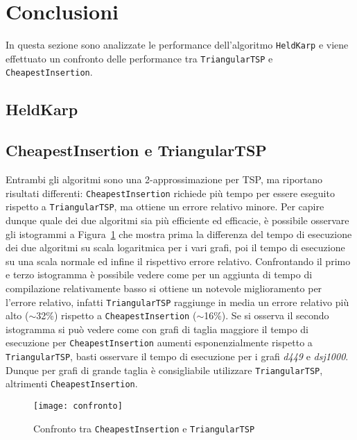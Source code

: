 \section{Conclusioni}
In questa sezione sono analizzate le performance dell'algoritmo \texttt{HeldKarp} e viene effettuato un confronto delle performance tra \texttt{TriangularTSP} e \texttt{CheapestInsertion}.

\subsection{HeldKarp}

\subsection{CheapestInsertion e TriangularTSP}
Entrambi gli algoritmi sono una 2-approssimazione per TSP, ma riportano risultati differenti: \texttt{CheapestInsertion} richiede più tempo per essere eseguito rispetto a \texttt{TriangularTSP}, ma ottiene un errore relativo minore. Per capire dunque quale dei due algoritmi sia più efficiente ed efficacie, è possibile osservare gli istogrammi a Figura~\ref{confronto} che mostra prima la differenza del tempo di esecuzione dei due algoritmi su scala logaritmica per i vari grafi, poi il tempo di esecuzione su una scala normale ed infine il rispettivo errore relativo. Confrontando il primo e terzo istogramma è possibile vedere come per un aggiunta di tempo di compilazione relativamente basso si ottiene un notevole miglioramento per l'errore relativo, infatti \texttt{TriangularTSP} raggiunge in media un errore relativo più alto ($\sim$32\%) rispetto a \texttt{CheapestInsertion} ($\sim$16\%). Se si osserva il secondo istogramma si può vedere come con grafi di taglia maggiore il tempo di esecuzione per \texttt{CheapestInsertion} aumenti esponenzialmente rispetto a \texttt{TriangularTSP}, basti osservare il tempo di esecuzione per i grafi \textit{d449} e \textit{dsj1000}.  Dunque per grafi di grande taglia è consigliabile utilizzare \texttt{TriangularTSP}, altrimenti \texttt{CheapestInsertion}.

\begin{figure}
	\centering
	\texttt{[image: confronto]}
	\caption{Confronto tra \texttt{CheapestInsertion} e \texttt{TriangularTSP}}
	\label{confronto}
\end{figure}

